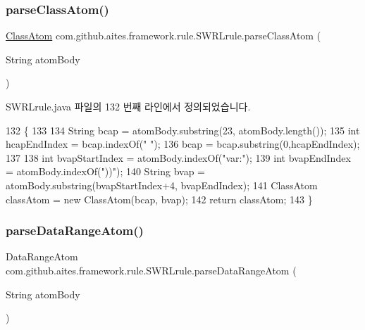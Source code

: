 \subsubsection{\texorpdfstring{parse\+Class\+Atom()}{parseClassAtom()}}
{\footnotesize\ttfamily \mbox{\hyperlink{classcom_1_1github_1_1aites_1_1framework_1_1rule_1_1_s_w_r_lrule_1_1_class_atom}{Class\+Atom}} com.\+github.\+aites.\+framework.\+rule.\+S\+W\+R\+Lrule.\+parse\+Class\+Atom (\begin{DoxyParamCaption}\item[{String}]{atom\+Body }\end{DoxyParamCaption})\hspace{0.3cm}{\ttfamily [private]}}



S\+W\+R\+Lrule.\+java 파일의 132 번째 라인에서 정의되었습니다.


\begin{DoxyCode}
132                                                      \{
133         
134         String bcap = atomBody.substring(23, atomBody.length());
135         \textcolor{keywordtype}{int} hcapEndIndex = bcap.indexOf(\textcolor{stringliteral}{" "});
136         bcap = bcap.substring(0,hcapEndIndex);
137         
138         \textcolor{keywordtype}{int} bvapStartIndex = atomBody.indexOf(\textcolor{stringliteral}{"var:"});
139         \textcolor{keywordtype}{int} bvapEndIndex = atomBody.indexOf(\textcolor{stringliteral}{"))"});
140         String bvap = atomBody.substring(bvapStartIndex+4, bvapEndIndex);
141         ClassAtom classAtom = \textcolor{keyword}{new} ClassAtom(bcap, bvap);
142         \textcolor{keywordflow}{return} classAtom;
143     \}
\end{DoxyCode}
\mbox{\label{classcom_1_1github_1_1aites_1_1framework_1_1rule_1_1_s_w_r_lrule_a98d9bcca97665200e8459358556d899d}} 
\subsubsection{\texorpdfstring{parse\+Data\+Range\+Atom()}{parseDataRangeAtom()}}
{\footnotesize\ttfamily Data\+Range\+Atom com.\+github.\+aites.\+framework.\+rule.\+S\+W\+R\+Lrule.\+parse\+Data\+Range\+Atom (\begin{DoxyParamCaption}\item[{String}]{atom\+Body }\end{DoxyParamCaption})\hspace{0.3cm}{\ttfamily [private]}}



